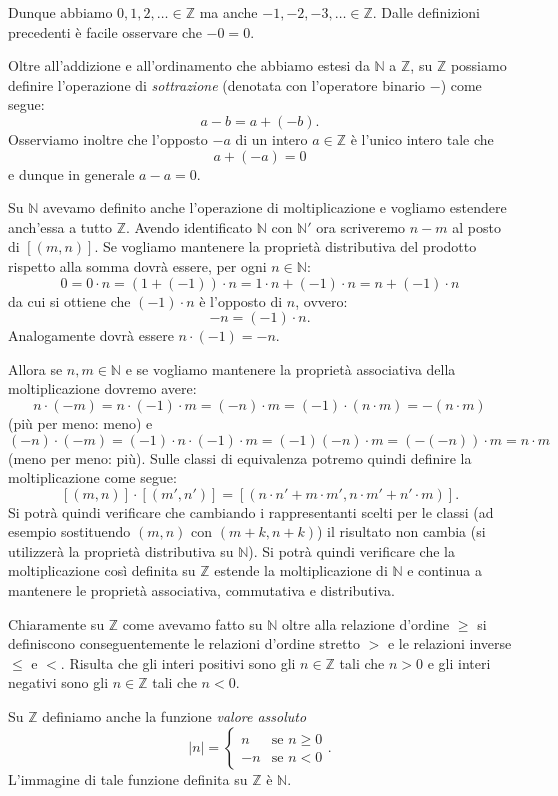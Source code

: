 \documentclass[italian,a4paper,hidelinks,headinclude]{scrartcl}
\newcommand{\NN}{{\mathbb N}}
\newcommand{\ZZ}{{\mathbb Z}}
\newcommand{\abs}[1]{\left\vert{#1}\right\vert}
\begin{document}
Dunque abbiamo $0,1,2,\dots \in \ZZ$ ma anche $-1,-2,-3, \dots \in \ZZ$.
Dalle definizioni precedenti è facile osservare che $-0=0$.

Oltre all'addizione e all'ordinamento che abbiamo estesi da $\NN$ a $\ZZ$,
su $\ZZ$ possiamo definire l'operazione di \emph{sottrazione} (denotata con
l'operatore binario $-$) come segue:
\[
  a-b = a + (-b).
\]
Osserviamo inoltre che l'opposto $-a$ di un intero $a\in \ZZ$ è l'unico
intero tale che
\[
  a + (-a) = 0
\]
e dunque in generale $a-a=0$.

Su $\NN$ avevamo definito anche l'operazione di moltiplicazione e vogliamo
estendere anch'essa a tutto $\ZZ$.
Avendo identificato $\NN$ con $\NN'$ ora scriveremo $n-m$ al posto di $[(m,n)]$.
Se vogliamo mantenere la proprietà distributiva del prodotto rispetto alla somma
dovrà essere, per ogni $n\in \NN$:
\[
  0 = 0\cdot n = (1+(-1))\cdot n = 1\cdot n + (-1)\cdot n
   = n + (-1)\cdot n
\]
da cui si ottiene che $(-1)\cdot n$ è l'opposto di $n$, ovvero:
\[
  -n = (-1)\cdot n.
\]
Analogamente dovrà essere $n\cdot (-1) = -n$.

Allora se $n,m\in \NN$ e se vogliamo mantenere la proprietà associativa
della moltiplicazione dovremo avere:
\[
  n \cdot (-m) = n \cdot (-1) \cdot m = (-n)\cdot m = (-1)\cdot (n\cdot m)
   = -(n\cdot m)
\]
(più per meno: meno)
e
\[
(-n)\cdot(-m) = (-1) \cdot n \cdot (-1) \cdot m = (-1)(-n)\cdot m
 = (-(-n))\cdot m = n\cdot m
\]
(meno per meno: più).
Sulle classi di equivalenza potremo quindi definire
la moltiplicazione come segue:
\[
[(m,n)]\cdot [(m',n')] = [(n\cdot n' + m\cdot m',n\cdot m' + n'\cdot m)].
\]
Si potrà quindi verificare che cambiando i rappresentanti scelti per le
classi (ad esempio sostituendo $(m,n)$ con $(m+k,n+k)$) il risultato non
cambia (si utilizzerà la proprietà distributiva su $\NN$).
Si potrà quindi verificare che la moltiplicazione così definita su $\ZZ$
estende la moltiplicazione di $\NN$ e continua a mantenere le proprietà associativa,
commutativa e distributiva.

Chiaramente su $\ZZ$ come avevamo fatto su $\NN$ oltre alla relazione d'ordine
$\ge$ si definiscono conseguentemente le relazioni d'ordine stretto $>$ e
le relazioni inverse $\le$ e $<$.
Risulta che gli interi positivi sono gli $n\in \ZZ$ tali che $n>0$ e gli
interi negativi sono gli $n\in \ZZ$ tali che $n<0$.

Su $\ZZ$ definiamo anche la funzione \emph{valore assoluto}
\[
  \abs{n} =
  \begin{cases}
      n & \text{se $n\ge 0$}\\
      -n & \text{se $n<0$}
  \end{cases}.
\]
L'immagine di tale funzione definita su $\ZZ$ è $\NN$.
\end{document}
